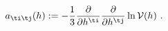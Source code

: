 \begin{equation}\label{aij}
a_{\ti\tj}(h):=-\frac{1}{3}\frac{\partial}{\partial h^{\ti}}
\frac{\partial}{\partial h^{\tj}} \ln \mathcal{V}(h)\ .
\end{equation}

